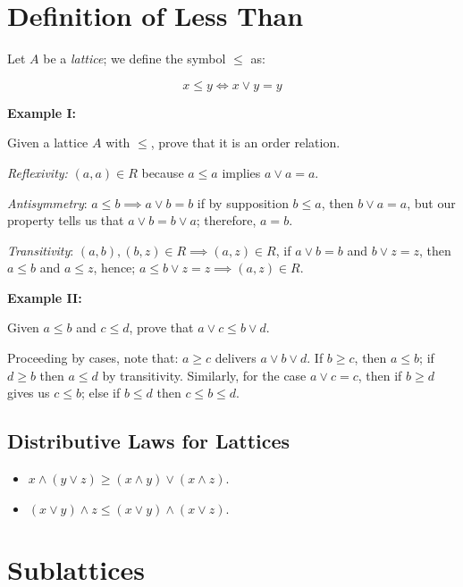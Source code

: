 \QED

\section{Definition of Less Than}

Let \(A\) be a \emph{lattice}; we define the symbol \(\le\) as:

\[
	x \le y \iff x \lor y = y
\]

\textbf{Example I:}

Given a lattice \(A\) with \(\le\), prove that it is an order relation.

\emph{Reflexivity:} \((a, a) \in R\) because \(a \le a\) implies \(a \lor a = a\).

\emph{Antisymmetry}: \(a \le b \implies a \lor b = b\) if by supposition \(b \le a\), then \(b \lor a = a\), but our property
tells us that \(a \lor b = b \lor a\); therefore, \(a = b\).

\emph{Transitivity}: \((a, b), (b, z) \in R \implies (a, z) \in R\), if \(a \lor b = b\) and \(b \lor z = z\), then
\(a \le b\) and \(a \le z\), hence; \(a \le b \lor z = z \implies (a, z) \in R\).

\QED

\textbf{Example II:}

Given \(a \le b\) and \(c \le d\), prove that \(a \lor c \le b \lor d\).

Proceeding by cases, note that: \(a \ge c\) delivers \(a \lor b \lor d\). If \(b \ge c\), then \(a \le b\);
if \(d \ge b\) then \(a \le d\) by transitivity. Similarly, for the case \(a \lor c = c\), then if \(b \ge d\) gives  us
\(c \le b\); else if \(b \le d\) then \(c \le b \le d\).

\QED

\subsection{Distributive Laws for Lattices}

\begin{itemize}

	\item \(x \land (y \lor z) \ge (x \land y) \lor (x \land z)\).

	\item \((x \lor y) \land z \le (x \lor y) \land (x \lor z)\).

\end{itemize}

\section{Sublattices}

